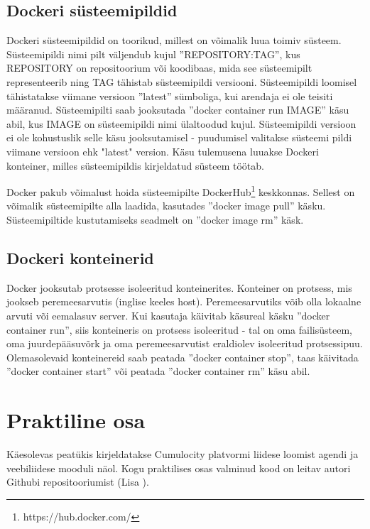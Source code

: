 \documentclass[12pt]{article}
\begin{document}
  \subsection{Dockeri süsteemipildid}
  Dockeri süsteemipildid on toorikud, millest on võimalik luua toimiv süsteem. Süsteemipildi
  nimi pilt väljendub kujul ''REPOSITORY:TAG'', kus REPOSITORY on repositoorium või koodibaas,
  mida see süsteemipilt representeerib ning TAG tähistab süsteemipildi versiooni.
  Süsteemipildi loomisel tähistatakse viimane versioon ''latest'' sümboliga, kui arendaja ei ole
  teisiti määranud. Süsteemipilti saab jooksutada ''docker container run IMAGE'' käsu abil, kus IMAGE on
  süsteemipildi nimi ülaltoodud kujul. Süsteemipildi versioon ei ole kohustuslik selle käsu
  jooksutamisel - puudumisel valitakse süsteemi pildi viimane versioon ehk "latest" version.
  Käsu tulemusena luuakse Dockeri konteiner, milles süsteemipildis kirjeldatud süsteem töötab.
  
  Docker pakub võimalust hoida süsteemipilte DockerHub\footnote{https://hub.docker.com/} keskkonnas.
  Sellest on võimalik süsteemipilte alla laadida, kasutades ''docker image pull'' käsku. Süsteemipiltide
  kustutamiseks seadmelt on ''docker image rm'' käsk.

  \subsection{Dockeri konteinerid}
  Docker jooksutab protsesse isoleeritud konteinerites. Konteiner on protsess, mis jookseb
  peremeesarvutis (inglise keeles host). Peremeesarvutiks võib olla lokaalne arvuti või
  eemalasuv server. Kui kasutaja käivitab käsureal käsku ''docker container run'', siis konteineris
  on protsess isoleeritud - tal on oma failisüsteem, oma juurdepääsuvõrk ja oma
  peremeesarvutist eraldiolev isoleeritud protsessipuu. Olemasolevaid konteinereid saab
  peatada ''docker container stop'',
  taas käivitada ''docker container start'' 
  või peatada ''docker container rm'' käsu abil.



  \newpage
  \section{Praktiline osa}
  Käesolevas peatükis kirjeldatakse Cumulocity platvormi liidese loomist agendi ja veebiliidese
  mooduli näol. Kogu praktilises osas valminud kood on leitav autori Githubi
  repositooriumist (Lisa ).
 
\end{document}
